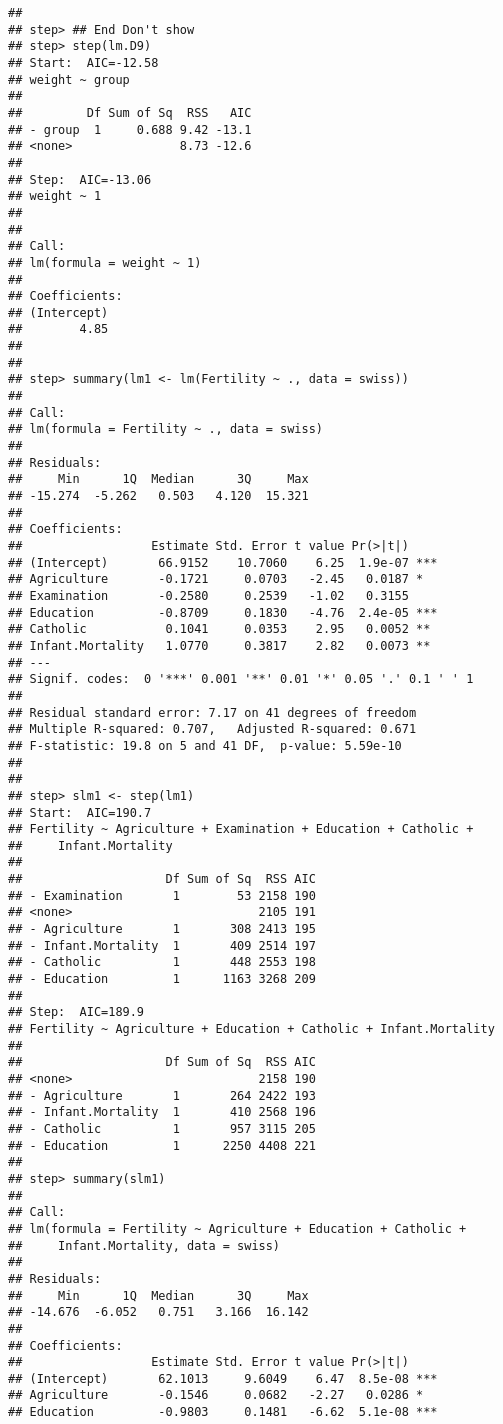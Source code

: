 \documentclass{beamer}\usepackage{graphicx, color}
\newenvironment{knitrout}{}{} %
\begin{document}
\begin{frame}
\begin{knitrout}
\begin{verbatim}
## 
## step> ## End Don't show
## step> step(lm.D9)  
## Start:  AIC=-12.58
## weight ~ group
## 
##         Df Sum of Sq  RSS   AIC
## - group  1     0.688 9.42 -13.1
## <none>               8.73 -12.6
## 
## Step:  AIC=-13.06
## weight ~ 1
## 
## 
## Call:
## lm(formula = weight ~ 1)
## 
## Coefficients:
## (Intercept)  
##        4.85  
## 
## 
## step> summary(lm1 <- lm(Fertility ~ ., data = swiss))
## 
## Call:
## lm(formula = Fertility ~ ., data = swiss)
## 
## Residuals:
##     Min      1Q  Median      3Q     Max 
## -15.274  -5.262   0.503   4.120  15.321 
## 
## Coefficients:
##                  Estimate Std. Error t value Pr(>|t|)    
## (Intercept)       66.9152    10.7060    6.25  1.9e-07 ***
## Agriculture       -0.1721     0.0703   -2.45   0.0187 *  
## Examination       -0.2580     0.2539   -1.02   0.3155    
## Education         -0.8709     0.1830   -4.76  2.4e-05 ***
## Catholic           0.1041     0.0353    2.95   0.0052 ** 
## Infant.Mortality   1.0770     0.3817    2.82   0.0073 ** 
## ---
## Signif. codes:  0 '***' 0.001 '**' 0.01 '*' 0.05 '.' 0.1 ' ' 1 
## 
## Residual standard error: 7.17 on 41 degrees of freedom
## Multiple R-squared: 0.707,	Adjusted R-squared: 0.671 
## F-statistic: 19.8 on 5 and 41 DF,  p-value: 5.59e-10 
## 
## 
## step> slm1 <- step(lm1)
## Start:  AIC=190.7
## Fertility ~ Agriculture + Examination + Education + Catholic + 
##     Infant.Mortality
## 
##                    Df Sum of Sq  RSS AIC
## - Examination       1        53 2158 190
## <none>                          2105 191
## - Agriculture       1       308 2413 195
## - Infant.Mortality  1       409 2514 197
## - Catholic          1       448 2553 198
## - Education         1      1163 3268 209
## 
## Step:  AIC=189.9
## Fertility ~ Agriculture + Education + Catholic + Infant.Mortality
## 
##                    Df Sum of Sq  RSS AIC
## <none>                          2158 190
## - Agriculture       1       264 2422 193
## - Infant.Mortality  1       410 2568 196
## - Catholic          1       957 3115 205
## - Education         1      2250 4408 221
## 
## step> summary(slm1)
## 
## Call:
## lm(formula = Fertility ~ Agriculture + Education + Catholic + 
##     Infant.Mortality, data = swiss)
## 
## Residuals:
##     Min      1Q  Median      3Q     Max 
## -14.676  -6.052   0.751   3.166  16.142 
## 
## Coefficients:
##                  Estimate Std. Error t value Pr(>|t|)    
## (Intercept)       62.1013     9.6049    6.47  8.5e-08 ***
## Agriculture       -0.1546     0.0682   -2.27   0.0286 *  
## Education         -0.9803     0.1481   -6.62  5.1e-08 ***

\end{verbatim}
\end{knitrout}
\end{frame}
\end{document}
